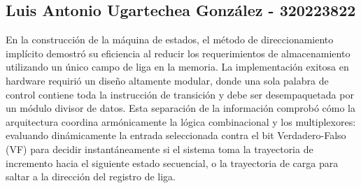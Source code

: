 \documentclass[12pt, letterpaper]{article}
\begin{document}
\subsection*{Luis Antonio Ugartechea González - 320223822}

En la construcción de la máquina de estados, el método de direccionamiento implícito demostró su eficiencia al reducir los requerimientos de almacenamiento utilizando un único campo de liga en la memoria. La implementación exitosa en hardware requirió un diseño altamente modular, donde una sola palabra de control contiene toda la instrucción de transición y debe ser desempaquetada por un módulo divisor de datos. Esta separación de la información comprobó cómo la arquitectura coordina armónicamente la lógica combinacional y los multiplexores: evaluando dinámicamente la entrada seleccionada contra el bit Verdadero-Falso (VF) para decidir instantáneamente si el sistema toma la trayectoria de incremento hacia el siguiente estado secuencial, o la trayectoria de carga para saltar a la dirección del registro de liga.


\end{document}
